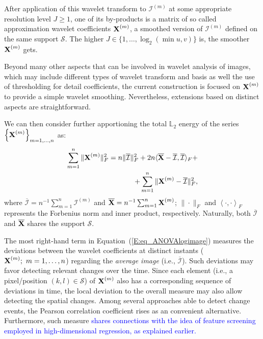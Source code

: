 \documentclass[journal]{IEEEtran}
\newcommand{\vX}{{\textbf X}}
\begin{document}
After application of this wavelet transform to $\mathcal{I}^{(m)}$ at some appropriate resolution level $J\geq 1$, one of its by-products is a matrix of so called approximation wavelet coefficients $\vX^{(m)}$, a smoothed version of $\mathcal{I}^{(m)}$ 
defined on the same support $\mathcal{S}$. The higher $J\in\{1,\ldots,\log_2( \min{u,v} )\}$ is, the smoother $\vX^{(m)}$ gets.

Beyond many other aspects that can be involved in wavelet analysis of images, which may include different types of wavelet transform and basis as well the use of thresholding for detail coefficients, the current construction is focused on $\vX^{(m)}$ to provide a simple wavelet smoothing. Nevertheless, extensions based on distinct aspects are straightforward.

We can then consider further apportioning the total $\mathbb{L}_2$ energy of the series $\left\{\vX^{(m)}\right\}_{m=1,\ldots,n}$ as:
\begin{equation}\label{E:eq_ANOVAlogimage}
\begin{split}
\sum_{m=1}^n\|\vX^{(m)}\|_F^2
= n\|\overline{\mathcal{I}}\|_F^2 + 2n\langle\overline{\vX}-\overline{\mathcal{I}},\overline{\mathcal{I}}\rangle_F + \\
+ \sum_{m=1}^n\|\mathcal \vX^{(m)} - \overline{\mathcal{I}}\|_F^2,
\end{split}
\end{equation}
where $\overline{\mathcal{I}}=n^{-1}\sum_{m=1}^n\mathcal{I}^{(m)}$ and $\overline{\vX}=n^{-1}\sum_{m=1}^n\vX^{(m)}$; $\| \cdot \|_F$ and $\left\langle \cdot , \cdot \right\rangle_F$ represents the Forbenius norm and inner product, respectively. Naturally, both $\overline{\mathcal{I}}$ and $\overline{\vX}$ shares the support $\mathcal{S}$.


The most right-hand term in Equation~(\ref{E:eq_ANOVAlogimage}) measures the deviations 
between the wavelet coefficients at distinct instants ($\vX^{(m)}; \ m=1,\ldots,n$) regarding the \textit{average image} (i.e., $\overline{\mathcal{I}}$). Such deviations may favor detecting relevant changes over the time. Since each element (i.e., a pixel/position $(k,l)\in \mathcal{S}$) of $\vX^{(m)}$ also has a corresponding sequence of deviations in time, the local deviation to the overall measure 
may also allow detecting the spatial changes. Among several approaches able to detect change events, the Pearson correlation coefficient rises as an convenient alternative. Furthermore, such measure \textcolor{blue}{shares connections with the idea of feature screening employed in high-dimensional regression, as explained earlier.}
\end{document}
